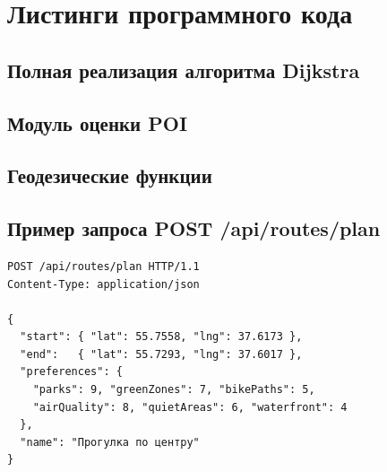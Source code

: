 \chapter{Листинги программного кода}
\label{app:listings}

\section{Полная реализация алгоритма Dijkstra}



\section{Модуль оценки POI}



\section{Геодезические функции}



\section{Пример запроса POST /api/routes/plan}

\begin{verbatim}
POST /api/routes/plan HTTP/1.1
Content-Type: application/json

{
  "start": { "lat": 55.7558, "lng": 37.6173 },
  "end":   { "lat": 55.7293, "lng": 37.6017 },
  "preferences": {
    "parks": 9, "greenZones": 7, "bikePaths": 5,
    "airQuality": 8, "quietAreas": 6, "waterfront": 4
  },
  "name": "Прогулка по центру"
}
\end{verbatim}
